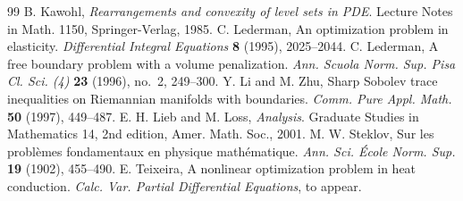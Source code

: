 \documentclass[11pt]{amsart}
\theoremstyle{definition}
\theoremstyle{remark}
\numberwithin{equation}{section}
\begin{document}
\begin{thebibliography}{99}
 B. Kawohl, \emph{Rearrangements and convexity of level sets in PDE}. Lecture Notes in Math. 1150, Springer-Verlag, 1985.
 C. Lederman, An optimization problem in elasticity. \emph{Differential Integral Equations} \textbf{8} (1995), 2025--2044.
 C. Lederman, A free boundary problem with a volume penalization. \emph{Ann. Scuola Norm. Sup. Pisa Cl. Sci. (4)} \textbf{23} (1996), no.~2, 249--300.
 Y. Li and M. Zhu, Sharp Sobolev trace inequalities on Riemannian manifolds with boundaries. \emph{Comm. Pure Appl. Math.} \textbf{50} (1997), 449--487.
 E. H. Lieb and M. Loss, \emph{Analysis}. Graduate Studies in Mathematics 14, 2nd edition, Amer. Math. Soc., 2001.
 M. W. Steklov, Sur les problèmes fondamentaux en physique mathématique. \emph{Ann. Sci. École Norm. Sup.} \textbf{19} (1902), 455--490.
 E. Teixeira, A nonlinear optimization problem in heat conduction. \emph{Calc. Var. Partial Differential Equations}, to appear.
\end{thebibliography}
\end{document}
